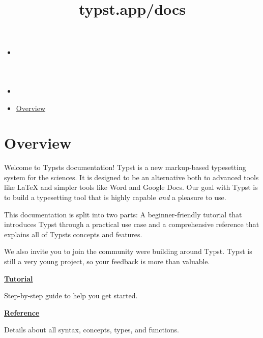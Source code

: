 \title{typst.app/docs}

\begin{itemize}
\tightlist
\item
  \href{/docs}{}
\item
  
\item
  \href{/docs/}{Overview}
\end{itemize}

\section{Overview}\label{overview}

Welcome to Typst\textquotesingle s documentation! Typst is a new
markup-based typesetting system for the sciences. It is designed to be
an alternative both to advanced tools like LaTeX and simpler tools like
Word and Google Docs. Our goal with Typst is to build a typesetting tool
that is highly capable \emph{and} a pleasure to use.

This documentation is split into two parts: A beginner-friendly tutorial
that introduces Typst through a practical use case and a comprehensive
reference that explains all of Typst\textquotesingle s concepts and
features.

We also invite you to join the community we\textquotesingle re building
around Typst. Typst is still a very young project, so your feedback is
more than valuable.

\href{/docs/tutorial}{
\textbf{Tutorial}}

Step-by-step guide to help you get started.

\href{/docs/reference}{
\textbf{Reference}}

Details about all syntax, concepts, types, and functions.
